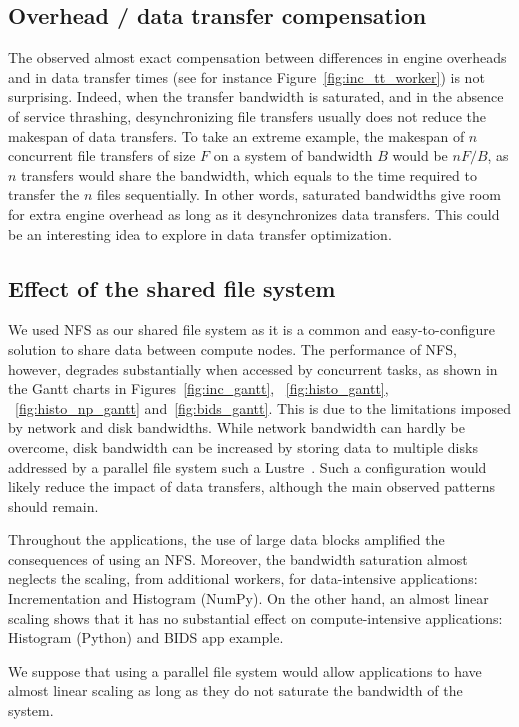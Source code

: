 \documentclass[conference]{IEEEtran}
\begin{document}
\subsection{Overhead / data transfer compensation}

The observed almost exact compensation between differences in engine
overheads and in data transfer times (see for instance
Figure~\ref{fig:inc_tt_worker}) is not surprising. Indeed, when the transfer
bandwidth is saturated, and in the absence of service thrashing,
desynchronizing file transfers usually does not reduce the makespan of data
transfers. To take an extreme example, the makespan of $n$ concurrent file
transfers of size $F$ on a system of bandwidth $B$ would be $nF/B$, as $n$
transfers would share the bandwidth, which equals to the time required
to transfer the $n$ files sequentially. In other words, saturated bandwidths
give room for extra engine overhead as long as it desynchronizes data
transfers. This could be an interesting idea to explore in data transfer optimization.

\subsection{Effect of the shared file system}

We used NFS as our shared file system as it is a common and
easy-to-configure solution to share data between compute nodes. The
performance of NFS, however, degrades substantially when accessed by
concurrent tasks, as shown in the Gantt charts in
Figures~\ref{fig:inc_gantt}, ~\ref{fig:histo_gantt}, ~\ref{fig:histo_np_gantt} 
and~\ref{fig:bids_gantt}. This is due to the limitations imposed by network and disk
bandwidths. While network bandwidth can hardly be overcome, disk bandwidth
can be increased by storing data to multiple disks addressed by a parallel
file system such a Lustre~\cite{lustre}. Such a configuration would likely
reduce the impact of data transfers, although the main observed patterns
should remain.

Throughout the applications, the use of large data blocks amplified the consequences
of using an NFS. Moreover, the bandwidth saturation almost neglects the scaling, from
additional workers, for data-intensive applications: Incrementation and Histogram
(NumPy). On the other hand, an almost linear scaling shows that it has no substantial
effect on compute-intensive applications: Histogram (Python) and BIDS app example.

We suppose that using a parallel file system would allow applications to have almost
linear scaling as long as they do not saturate the bandwidth of the system.
\end{document}
